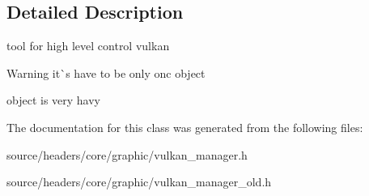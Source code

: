 \subsection{Detailed Description}
tool for high level control vulkan 

\begin{DoxyWarning}{Warning}
it\`{}s have to be only onc object 

object is very havy 
\end{DoxyWarning}


The documentation for this class was generated from the following files\+:\begin{DoxyCompactItemize}
\item 
source/headers/core/graphic/vulkan\+\_\+manager.\+h\item 
source/headers/core/graphic/vulkan\+\_\+manager\+\_\+old.\+h\end{DoxyCompactItemize}
